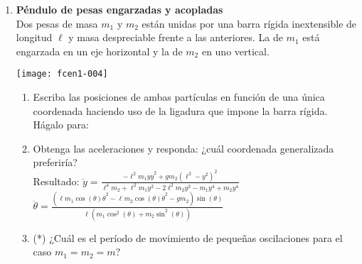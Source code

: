 \documentclass[11pt, spanish, a4paper, twoside]{article}
\begin{document}
\begin{enumerate}
\item 
\begin{minipage}[t][1.5cm]{0.7\textwidth}
	\textbf{Péndulo de pesas engarzadas y acopladas}\\ 
	Dos pesas de masa \(m_1\) y \(m_2\) están unidas por una barra rígida inextensible de longitud \(\ell\) y masa despreciable frente a las anteriores.
	La de \(m_1\) está engarzada en un eje horizontal y la de \(m_2\) en uno vertical.
\end{minipage}
\begin{minipage}[c][2cm][t]{0.3\textwidth}
	\texttt{[image: fcen1-004]}
\end{minipage}
\begin{enumerate}
	\item Escriba las posiciones de ambas partículas en función de una única coordenada haciendo uso de la ligadura que impone la barra rígida.
	Hágalo para:
	\item Obtenga las aceleraciones y responda: ¿cuál coordenada generalizada preferiría?\\
	Resultado:
		$\ddot{y} = \frac{- \ell^{2} m_{1} y \dot{y}^{2} + g m_{2} \left(\ell^{2} - y^{2}\right)^{2}}{\ell^{4} m_{2} + \ell^{2} m_{1} y^{2} - 2 \ell^{2} m_{2} y^{2} - m_{1} y^{4} + m_{2} y^{4}}$
		\qquad
		$\ddot{\theta} = \frac{\left(\ell m_{1} \cos{\left(\theta \right)} \dot{\theta}^{2} - \ell m_{2} \cos{\left(\theta \right)} \dot{\theta}^{2} - g m_{2}\right) \sin{\left(\theta \right)}}{\ell \left(m_{1} \cos^{2}{\left(\theta \right)} + m_{2} \sin^{2}{\left(\theta \right)}\right)}$
	\item (*) ¿Cuál es el período de movimiento de pequeñas oscilaciones para el caso \(m_1 = m_2 = m\)?
\end{enumerate}




\end{enumerate}
\end{document}
